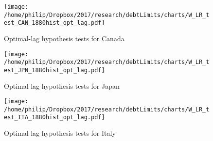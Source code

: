 \documentclass{article}
\begin{document}
	\begin{figure}[htbp]
	    \centering
		\texttt{[image: /home/philip/Dropbox/2017/research/debtLimits/charts/W\_LR\_test\_CAN\_1880hist\_opt\_lag.pdf]}
		\caption{Optimal-lag hypothesis tests for Canada}
	\end{figure}
	
		\begin{figure}[htbp]
	    \centering
		\texttt{[image: /home/philip/Dropbox/2017/research/debtLimits/charts/W\_LR\_test\_JPN\_1880hist\_opt\_lag.pdf]}
		\caption{Optimal-lag hypothesis tests for Japan}
	\end{figure}
	
		\begin{figure}[htbp]
	    \centering
		\texttt{[image: /home/philip/Dropbox/2017/research/debtLimits/charts/W\_LR\_test\_ITA\_1880hist\_opt\_lag.pdf]}
		\caption{Optimal-lag hypothesis tests for Italy}
	\end{figure}
\end{document}
